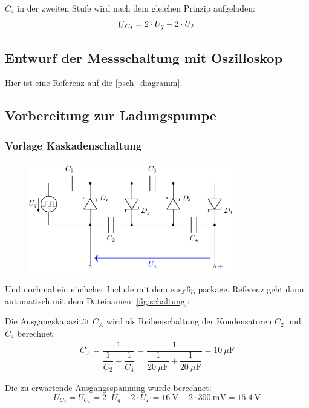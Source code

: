\documentclass[
12pt,
a4paper,
headings=small,                    %
bibliography=totoc,                %
listof=totoc,                      %
parskip=half*,                     %
]{scrartcl}                        %
\newcommand{\ul}[1]{\underline{#1\mkern-1.5mu}\mkern 1.5mu}
\newcommand{\laborsubsection}[2] {
    \renewcommand{\thesubsection}{#1 \thesection.\arabic{subsection}}
    \subsection{#2}
    \renewcommand{\thesubsection}{\thesection.\arabic{subsection}}
}
\begin{document}
$C_4$ in der zweiten Stufe wird nach dem gleichen Prinzip aufgeladen:
\begin{equation}
    \ul{U}_{C_4} = 2 \cdot U_{q} - 2 \cdot U_{F}
\end{equation}

\laborsubsection{V}{Entwurf der Messschaltung mit Oszilloskop}
Hier ist eine Referenz auf die \autoref{psch_diagramm}.
\begin{figure}[H]
    \centering
    \label{psch_diagramm}
\end{figure}

\laborsubsection{V}{Vorbereitung zur Ladungspumpe}
\subsubsection{Vorlage Kaskadenschaltung}
\begin{figure}[H]
    \centering
    \includegraphics[width=0.8\textwidth]{schaltung}
    \label{kaskadenschaltung}
\end{figure}

Und nochmal ein einfacher Include mit dem easyfig package. Referenz geht dann automatisch mit dem Dateinamen: \autoref{fig:schaltung}:

Die Ausgangskapazität $C_A$ wird als Reihenschaltung der Kondensatoren $C_2$ und $C_4$ berechnet:
\begin{align}
    C_A = \dfrac{1}{\dfrac{1}{C_2}+\dfrac{1}{C_4}} = \dfrac{1}{\dfrac{1}{\SI{20}{\mu\farad}}+\dfrac{1}{\SI{20}{\mu\farad}}} = \SI{10}{\mu\farad}
\end{align}

Die zu erwartende Ausgangsspannung wurde berechnet:
\begin{equation}
    U_{C_2} =  U_{C_4}  = 2 \cdot U_{q} - 2 \cdot U_{F} = \SI{16}{\volt} - 2 \cdot \SI{300}{\milli\volt} = \SI{15,4}{\volt}
\end{equation}
\end{document}
